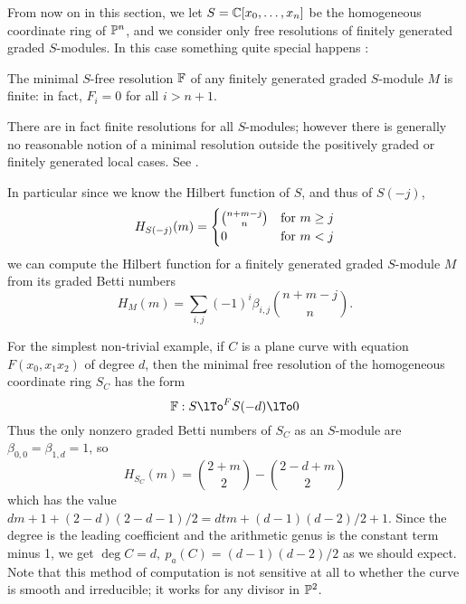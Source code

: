 From now on in this section, we let $S = \CC[x_{0},\dots, x_{n}]$ be the homogeneous coordinate ring of $\PP^{n}$, and we consider only free resolutions of finitely generated graded $S$-modules. In this case something quite special happens \cite[****]{E}:

\begin{theorem}\label{hst}
The minimal $S$-free resolution $\FF$ of any finitely generated graded $S$-module $M$ is finite: in fact, $F_{i}=0$ for all $i>n+1$.
\end{theorem}

\begin{fact}
 There are in fact finite resolutions for all $S$-modules; however there is generally no reasonable notion of a  minimal resolution outside the positively graded or finitely generated local cases. See \cite{???}.
\end{fact}

 In particular since we know the Hilbert function of $S$, and thus of $S(-j)$,
$$
H_{S(-j)}(m) = 
\begin{cases}
 {n+m-j \choose n} & \hbox{for $m\geq j$}
  \\ 
 0 & \hbox{for $m<j$}
\end{cases}
$$
we can compute the Hilbert function for a finitely generated graded $S$-module $M$ from its graded Betti numbers 
$$
H_{M}(m) = \sum_{i,j} (-1)^{i}\beta_{i,j}{n+m-j\choose n}.
$$
\begin{example}  
For the simplest non-trivial example, if $C$ is a plane curve with equation $F(x_{0},x_{1}x_{2})$ of 
degree $d$, then the minimal free resolution of the homogeneous coordinate ring $S_{C}$ has the form
$$
\FF: S\lTo^{F}S(-d)\lTo 0
$$
Thus the only nonzero graded Betti numbers of $S_{C}$ as an $S$-module are
 $\beta_{0,0} = \beta_{1,d} = 1$, so
$$
 H_{S_{C}}(m) = {2+m\choose 2} - {2-d+m\choose 2}
 $$
 which has the value  $dm + 1+(2-d)(2-d-1)/2 = dtm+ (d-1)(d-2)/2 +1$. Since the degree is the leading coefficient and the arithmetic genus  is the constant term minus 1, we get
$\deg C = d,\ p_{a}(C) = (d-1)(d-2)/2$ as we should expect.  Note that this method of computation is not sensitive at all to whether the curve is smooth and irreducible; it works for any divisor in $\PP^{2}$.
\end{example}

